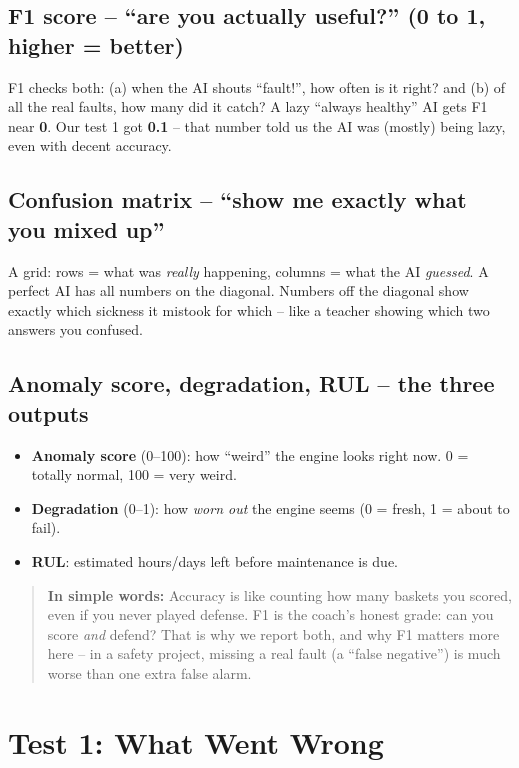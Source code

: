 \documentclass[11pt]{article}
\newenvironment{simplebox}
  {\par\medskip\noindent\begin{quote}\color{blue!55!black}\small
   \textbf{\textsf{In simple words:}}\space\space}
  {\end{quote}\medskip}
\begin{document}
\subsection*{F1 score -- ``are you actually useful?'' (0 to 1, higher = better)}
F1 checks both: (a) when the AI shouts ``fault!'', how often is it right?
and (b) of all the real faults, how many did it catch? A lazy
``always healthy'' AI gets F1 near \textbf{0}. Our test 1 got
\textbf{0.1} -- that number told us the AI was (mostly) being lazy, even
with decent accuracy.

\subsection*{Confusion matrix -- ``show me exactly what you mixed up''}
A grid: rows = what was \emph{really} happening, columns = what the AI
\emph{guessed}. A perfect AI has all numbers on the diagonal. Numbers off
the diagonal show exactly which sickness it mistook for which -- like a
teacher showing which two answers you confused.

\subsection*{Anomaly score, degradation, RUL -- the three outputs}
\begin{itemize}[nosep]
  \item \textbf{Anomaly score} (0--100): how ``weird'' the engine looks
        right now. 0 = totally normal, 100 = very weird.
  \item \textbf{Degradation} (0--1): how \emph{worn out} the engine seems
        (0 = fresh, 1 = about to fail).
  \item \textbf{RUL}: estimated hours/days left before maintenance is due.
\end{itemize}

\begin{simplebox}
Accuracy is like counting how many baskets you scored, even if you never
played defense. F1 is the coach's honest grade: can you score \emph{and}
defend? That is why we report both, and why F1 matters more here -- in a
safety project, missing a real fault (a ``false negative'') is much worse
than one extra false alarm.
\end{simplebox}

\section{Test 1: What Went Wrong}
\end{document}
